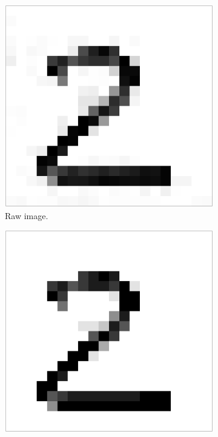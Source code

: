 \begin{figure}[H]
\centering
    \begin{subfigure}{0.22\textwidth}
        \includegraphics[width = \textwidth]{graphics/bins_inf}
        \caption{Raw image.}
    \end{subfigure}
    \begin{subfigure}{0.22\textwidth}
        \includegraphics[width = \textwidth]{graphics/bins_10}

\end{subfigure}
\end{figure}
